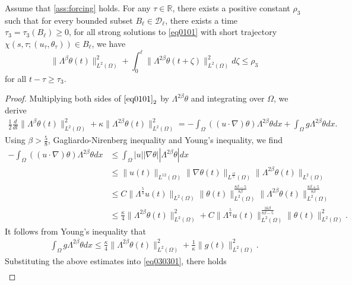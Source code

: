 \documentclass[oneside,preprint,12pt,numbers,sort&compress]{elsarticle}
\begin{document}
\begin{lemma}\label{lem0303}
Assume that \cref{ass:forcing} holds. For any $\tau \in \mathbb{R}$, there exists a positive constant $\rho_3$ such that for every bounded subset $B_{\ell} \in \mathcal{D}_{\ell}$, there exists a time $\tau_3 =\tau_3(B_{\ell}) \geq 0 $, for all strong solutions to \cref{eq0101} with short trajectory $\chi(s,\tau; (u_\tau, \theta_\tau)) \in B_{\ell}$, we have 
\[
\| \Lambda^{\beta} \theta(t)\|_{L^2(\Omega)}^{2}
+ \int_{0}^{\ell} \| \Lambda^{2\beta} \theta(t+\zeta) \|_{L^2(\Omega)}^{2} d\zeta 
\leq \rho_3
\]
for all $t-\tau \geq \tau_3$.
\end{lemma}
\begin{proof}
Multiplying both sides of $\eqref{eq0101}_{2}$ by $\Lambda^{2\beta}\theta$ and integrating over $\Omega$, we derive
\begin{align}\label{eq030301}
  \frac{1}{2}\frac{d}{dt}\|\Lambda^{\beta}\theta(t)\|_{L^2(\Omega)}^2 + \kappa\| \Lambda^{2\beta} \theta(t)\|_{L^2(\Omega)}^2
  = - \int_{\Omega}\left((u\cdot\nabla)\theta\right)\Lambda^{2\beta}\theta dx
  + \int_{\Omega}g\Lambda^{2\beta}\theta dx.
\end{align}
Using $\beta>\frac{5}{8}$, Gagliardo-Nirenberg inequality and Young's inequality, we find
\begin{align*}
   -\int_{\Omega}\left((u\cdot\nabla)\theta\right)\Lambda^{2\beta}\theta dx
   & \leq \int_{\Omega}|u||\nabla \theta||\Lambda^{2\beta}\theta|dx \\
   & \leq
   \|u(t)\|_{L^{12}(\Omega)}
   \|\nabla \theta(t)\|_{L^{\frac{12}{5}}(\Omega)}
   \|\Lambda^{2\beta}\theta(t)\|_{L^2(\Omega)} \\
   & \leq C
   \|\Lambda^{\frac{5}{4}}u(t)\|_{L^{2}(\Omega)}
   \|\theta(t)\|_{L^{2}(\Omega)}^{\frac{8\beta-5}{8\beta}}
   \|\Lambda^{2\beta}\theta(t)\|_{L^2(\Omega)}^{\frac{8\beta+5}{8\beta}} \\
   & \leq \frac{\kappa}{4}
   \|\Lambda^{2\beta}\theta(t)\|_{L^2(\Omega)}^{2} 
   +C
   \|\Lambda^{\frac{5}{4}}u(t)\|_{L^{2}(\Omega)}^{\frac{16\beta}{8\beta-5}}
   \|\theta(t)\|_{L^{2}(\Omega)}^{2}.
\end{align*}
It follows from Young's inequality that
\begin{align*}
\int_{\Omega}g\Lambda^{2\beta}\theta dx \leq \frac{\kappa}{4}\|\Lambda^{2\beta}\theta(t)\|_{L^2(\Omega)}^{2} 
+\frac{1}{\kappa}\|g(t)\|_{L^2(\Omega)}^{2}.
\end{align*}
Substituting the above estimates into \cref{eq030301}, there holds
\begin{align}\label{eq030302}

\end{align}
\end{proof}
\end{document}
